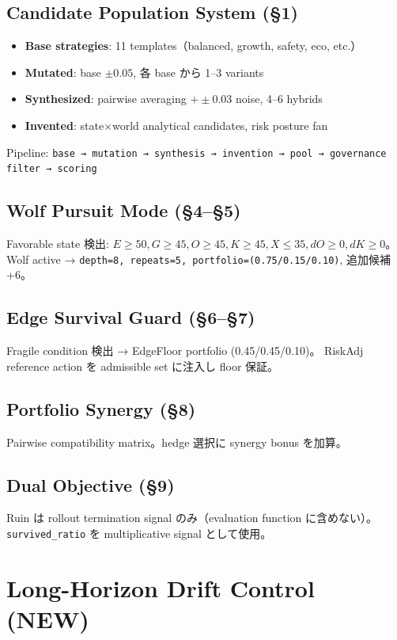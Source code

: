 \documentclass[11pt,a4paper]{article}
\begin{document}
\subsection{Candidate Population System (\S1)}
\begin{itemize}[leftmargin=1.5em]
  \item \textbf{Base strategies}: 11 templates（balanced, growth, safety, eco, etc.）
  \item \textbf{Mutated}: base $\pm 0.05$, 各 base から 1--3 variants
  \item \textbf{Synthesized}: pairwise averaging $+ \pm 0.03$ noise, 4--6 hybrids
  \item \textbf{Invented}: state$\times$world analytical candidates, risk posture fan
\end{itemize}

Pipeline: \texttt{base → mutation → synthesis → invention → pool → governance filter → scoring}

\subsection{Wolf Pursuit Mode (\S4--\S5)}
Favorable state 検出: $E \geq 50, G \geq 45, O \geq 45, K \geq 45, X \leq 35, dO \geq 0, dK \geq 0$。
Wolf active → \texttt{depth=8, repeats=5, portfolio=(0.75/0.15/0.10)}, 追加候補 +6。

\subsection{Edge Survival Guard (\S6--\S7)}
Fragile condition 検出 → EdgeFloor portfolio (0.45/0.45/0.10)。
RiskAdj reference action を admissible set に注入し floor 保証。

\subsection{Portfolio Synergy (\S8)}
Pairwise compatibility matrix。hedge 選択に synergy bonus を加算。

\subsection{Dual Objective (\S9)}
Ruin は rollout termination signal のみ（evaluation function に含めない）。
\texttt{survived\_ratio} を multiplicative signal として使用。


\section{Long-Horizon Drift Control (NEW)}
\end{document}
